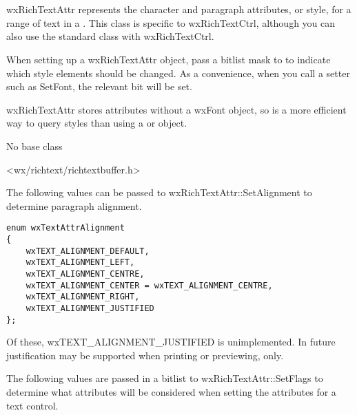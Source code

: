 \section{}\label{wxrichtextattr}

wxRichTextAttr represents the character and paragraph attributes, or style,
for a range of text in a . This class
is specific to wxRichTextCtrl, although you can also use the
standard  class with wxRichTextCtrl.

When setting up a wxRichTextAttr object, pass a bitlist mask to  to
indicate which style elements should be changed. As a convenience, when you call a setter such
as SetFont, the relevant bit will be set.

wxRichTextAttr stores attributes without a wxFont object, so is a more
efficient way to query styles than using a  or  object.


No base class


<wx/richtext/richtextbuffer.h>


The following values can be passed to wxRichTextAttr::SetAlignment to determine
paragraph alignment.

{\small
\begin{verbatim}
enum wxTextAttrAlignment
{
    wxTEXT_ALIGNMENT_DEFAULT,
    wxTEXT_ALIGNMENT_LEFT,
    wxTEXT_ALIGNMENT_CENTRE,
    wxTEXT_ALIGNMENT_CENTER = wxTEXT_ALIGNMENT_CENTRE,
    wxTEXT_ALIGNMENT_RIGHT,
    wxTEXT_ALIGNMENT_JUSTIFIED
};
\end{verbatim}
}

Of these, wxTEXT\_ALIGNMENT\_JUSTIFIED is unimplemented. In future justification may be supported
when printing or previewing, only.

The following values are passed in a bitlist to wxRichTextAttr::SetFlags to determine
what attributes will be considered when setting the attributes
for a text control.

